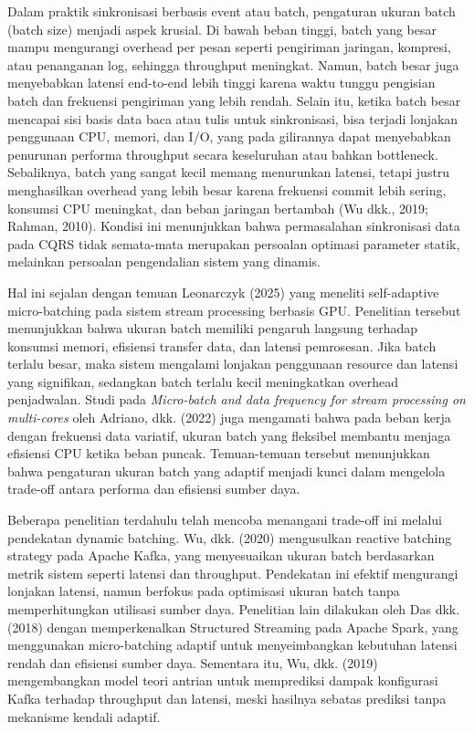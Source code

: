 Dalam praktik sinkronisasi berbasis event atau batch, pengaturan ukuran batch (batch size) menjadi aspek krusial.
Di bawah beban tinggi, batch yang besar mampu mengurangi overhead per pesan seperti pengiriman jaringan, kompresi, atau penanganan log, sehingga throughput meningkat.
Namun, batch besar juga menyebabkan latensi end-to-end lebih tinggi karena waktu tunggu pengisian batch dan frekuensi pengiriman yang lebih rendah.
Selain itu, ketika batch besar mencapai sisi basis data baca atau tulis untuk sinkronisasi, bisa terjadi lonjakan penggunaan CPU, memori, dan I/O, yang pada gilirannya dapat menyebabkan penurunan performa throughput secara keseluruhan atau bahkan bottleneck.
Sebaliknya, batch yang sangat kecil memang menurunkan latensi, tetapi justru menghasilkan overhead yang lebih besar karena frekuensi commit lebih sering, konsumsi CPU meningkat, dan beban jaringan bertambah (Wu dkk., 2019; Rahman, 2010).
Kondisi ini menunjukkan bahwa permasalahan sinkronisasi data pada CQRS tidak semata-mata merupakan persoalan optimasi parameter statik, melainkan persoalan pengendalian sistem yang dinamis.

Hal ini sejalan dengan temuan Leonarczyk (2025) yang meneliti self-adaptive micro-batching pada sistem stream processing berbasis GPU.
Penelitian tersebut menunjukkan bahwa ukuran batch memiliki pengaruh langsung terhadap konsumsi memori, efisiensi transfer data, dan latensi pemrosesan.
Jika batch terlalu besar, maka sistem mengalami lonjakan penggunaan resource dan latensi yang signifikan, sedangkan batch terlalu kecil meningkatkan overhead penjadwalan.
Studi pada \emph{Micro-batch and data frequency for stream processing on multi-cores} oleh Adriano, dkk. (2022) juga mengamati bahwa pada beban kerja dengan frekuensi data variatif, ukuran batch yang fleksibel membantu menjaga efisiensi CPU ketika beban puncak.
Temuan-temuan tersebut menunjukkan bahwa pengaturan ukuran batch yang adaptif menjadi kunci dalam mengelola trade-off antara performa dan efisiensi sumber daya.

Beberapa penelitian terdahulu telah mencoba menangani trade-off ini melalui pendekatan dynamic batching.
Wu, dkk. (2020) mengusulkan reactive batching strategy pada Apache Kafka, yang menyesuaikan ukuran batch berdasarkan metrik sistem seperti latensi dan throughput.
Pendekatan ini efektif mengurangi lonjakan latensi, namun berfokus pada optimisasi ukuran batch tanpa memperhitungkan utilisasi sumber daya.
Penelitian lain dilakukan oleh Das dkk. (2018) dengan memperkenalkan Structured Streaming pada Apache Spark, yang menggunakan micro-batching adaptif untuk menyeimbangkan kebutuhan latensi rendah dan efisiensi sumber daya.
Sementara itu, Wu, dkk. (2019) mengembangkan model teori antrian untuk memprediksi dampak konfigurasi Kafka terhadap throughput dan latensi, meski hasilnya sebatas prediksi tanpa mekanisme kendali adaptif.

